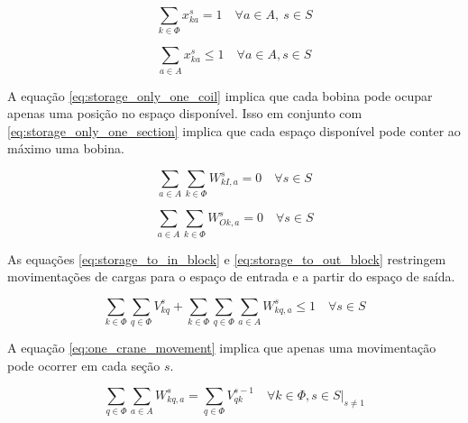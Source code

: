\documentclass[journal]{IEEEtran}
\begin{document}
        \begin{equation}
            \sum_{k \in \Phi} x^s_{ka} = 1 \quad \forall a \in A,\ s \in S
            \label{eq:storage_only_one_coil}
        \end{equation}

        \begin{equation}
            \sum_{a \in A} x^s_{ka} \leq 1 \quad \forall a \in A, s \in S
            \label{eq:storage_only_one_section}
        \end{equation}

        A equação \ref{eq:storage_only_one_coil} implica que cada bobina pode 
        ocupar apenas uma posição no espaço disponível. Isso em conjunto com 
        \ref{eq:storage_only_one_section} implica que cada espaço disponível 
        pode conter ao máximo uma bobina.

        \begin{equation}
            \sum_{a \in A}
            \sum_{k \in \Phi}
            W^s_{kI, a} = 0 \quad \forall s \in S 
            \label{eq:storage_to_in_block}
        \end{equation}

        \begin{equation}
            \sum_{a \in A}
            \sum_{k \in \Phi}
            W^s_{Ok, a} = 0 \quad \forall s \in S 
            \label{eq:storage_to_out_block}
        \end{equation}
        
        As equações \ref{eq:storage_to_in_block} e \ref{eq:storage_to_out_block}
        restringem movimentações de cargas para o espaço de entrada e a partir do
        espaço de saída.

        \begin{equation}
            \sum_{k \in \Phi} \sum_{q \in \Phi} V^s_{kq} + \sum_{k \in \Phi} \sum_{q \in \Phi} \sum_{a \in A} W^s_{kq,a} \leq 1 \quad \forall s \in S \tag{11}
            \label{eq:one_crane_movement}
        \end{equation}

        A equação \ref{eq:one_crane_movement} implica que apenas uma movimentação
        pode ocorrer em cada seção $s$.

        \begin{equation}
            \sum_{q \in \Phi} \sum_{a \in A} W^s_{kq,a} = \sum_{q \in \Phi} V^{s-1}_{qk} \quad \forall k \in \Phi, s \in S |_{s \neq 1}
            \label{eq:movement_precence_ld_after_empty}
        \end{equation}
\end{document}
